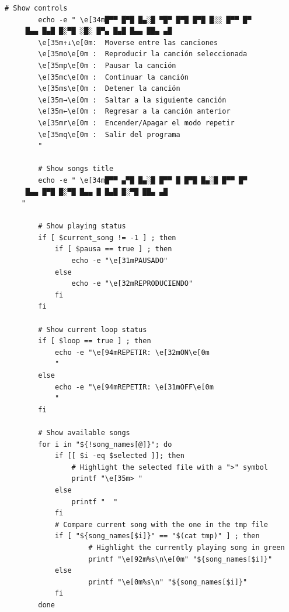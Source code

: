 \documentclass[12pt,a4paper]{article}
\begin{document}
\begin{lstlisting}[style=BashInputStyle]
		# Show controls
		echo -e " \e[34m█▀▀ █▀█ █▄░█ ▀█▀ █▀█ █▀█ █░░ █▀▀ █▀
	 █▄▄ █▄█ █░▀█ ░█░ █▀▄ █▄█ █▄▄ ██▄ ▄█
		\e[35m↑↓\e[0m: 	Moverse entre las canciones
		\e[35mo\e[0m : 	Reproducir la canción seleccionada
		\e[35mp\e[0m : 	Pausar la canción
		\e[35mc\e[0m : 	Continuar la canción
		\e[35ms\e[0m : 	Detener la canción
		\e[35m→\e[0m : 	Saltar a la siguiente canción
		\e[35m←\e[0m : 	Regresar a la canción anterior
		\e[35mr\e[0m : 	Encender/Apagar el modo repetir
		\e[35mq\e[0m : 	Salir del programa
		"

		# Show songs title
		echo -e " \e[34m█▀▀ ▄▀█ █▄░█ █▀▀ █ █▀█ █▄░█ █▀▀ █▀
	 █▄▄ █▀█ █░▀█ █▄▄ █ █▄█ █░▀█ ██▄ ▄█
	"

		# Show playing status
		if [ $current_song != -1 ] ; then
			if [ $pausa == true ] ; then
				echo -e "\e[31mPAUSADO"
			else
				echo -e "\e[32mREPRODUCIENDO"
			fi
		fi

		# Show current loop status
		if [ $loop == true ] ; then
			echo -e "\e[94mREPETIR: \e[32mON\e[0m
			"
		else
			echo -e "\e[94mREPETIR: \e[31mOFF\e[0m
			"
		fi
	
	    # Show available songs
		for i in "${!song_names[@]}"; do
			if [[ $i -eq $selected ]]; then
	        	# Highlight the selected file with a ">" symbol
		        printf "\e[35m> "
			else
				printf "  "
			fi
			# Compare current song with the one in the tmp file
			if [ "${song_names[$i]}" == "$(cat tmp)" ] ; then
		        	# Highlight the currently playing song in green
			        printf "\e[92m%s\n\e[0m" "${song_names[$i]}"
			else
	        		printf "\e[0m%s\n" "${song_names[$i]}"
		    fi
	    done
	

\end{lstlisting}
\end{document}
